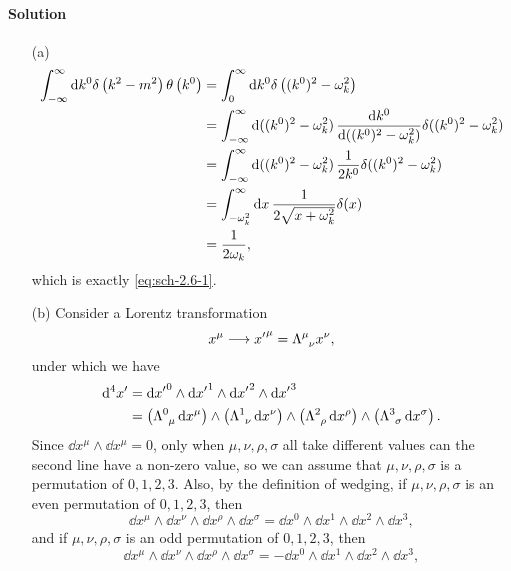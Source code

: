 \documentclass[hyperref, a4paper]{article}
\begin{document}
\paragraph{Solution} 
\begin{itemize}
    \item[(a)] \[
        \begin{aligned}
        \int_{-\infty}^{\infty} \dd k^{0} \delta\left(k^{2}-m^{2}\right) \theta\left(k^{0}\right) &= \int_{0}^{\infty} \dd k^{0} \delta\left((k^0)^2 - \omega_k^2 \right)  \\
        &= \int_{-\infty}^\infty \dd{((k^0)^2 - \omega_k^2)} \dv{k^0}{((k^0)^2 - \omega_k^2)} \delta((k^0)^2 - \omega_k^2) \\
        &= \int_{-\infty}^\infty \dd{((k^0)^2 - \omega_k^2)} \frac{1}{2 k^0} \delta((k^0)^2 - \omega_k^2) \\
        &= \int_{-\omega_k^2}^\infty \dd{x} \frac{1}{2 \sqrt{x + \omega_k^2}} \delta(x) \\
        &= \frac{1}{2 \omega_k},
        \end{aligned}
    \]
    which is exactly \eqref{eq:sch-2.6-1}.
    \item[(b)] Consider a Lorentz transformation
    \[
        x^\mu \longrightarrow {x'}^{\mu} = \Lambda\indices{^{\mu}_\nu} x^\nu,
    \] 
    under which we have
    \[
        \begin{aligned}
            \dd[4]{x'} &= \dd{{x'}^0} \wedge \dd{{x'}^1} \wedge \dd{{x'}^2} \wedge \dd{{x'}^3} \\
            &= \left( \Lambda\indices{^0_\mu} \dd{x^\mu} \right) \wedge \left( \Lambda\indices{^1_\nu} \dd{x^\nu} \right) \wedge \left( \Lambda\indices{^2_\rho} \dd{x^\rho} \right) \wedge \left( \Lambda\indices{^3_\sigma} \dd{x^\sigma} \right).
        \end{aligned}
    \]
    Since $\dd{x^\mu} \wedge \dd{x^\mu} = 0$, only when $\mu, \nu, \rho, \sigma$ all take different values can the second line have a non-zero value, so we can assume that $\mu, \nu, \rho, \sigma$ is a permutation of $0, 1, 2, 3$.
    Also, by the definition of wedging, if $\mu, \nu, \rho, \sigma$ is an even permutation of $0, 1, 2, 3$, then
    \[
        \dd{x^\mu} \wedge \dd{x^\nu} \wedge \dd{x^\rho} \wedge \dd{x^\sigma} = \dd{x^0} \wedge \dd{x^1} \wedge \dd{x^2} \wedge \dd{x^3},
    \]
    and if $\mu, \nu, \rho, \sigma$ is an odd permutation of $0, 1, 2, 3$, then
    \[
        \dd{x^\mu} \wedge \dd{x^\nu} \wedge \dd{x^\rho} \wedge \dd{x^\sigma} = - \dd{x^0} \wedge \dd{x^1} \wedge \dd{x^2} \wedge \dd{x^3},
\]
\end{itemize}
\end{document}
